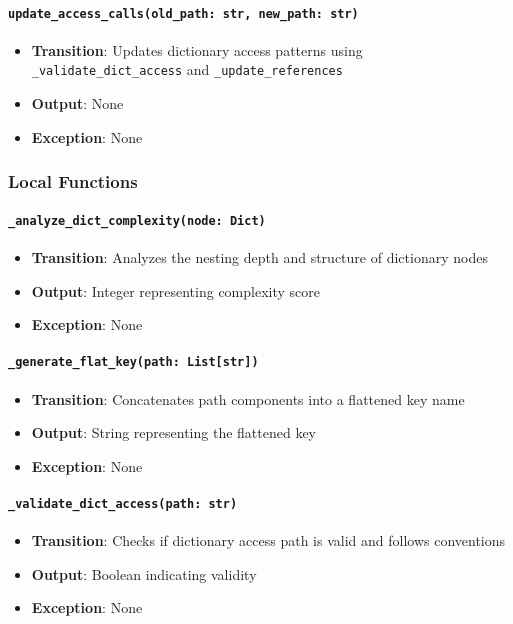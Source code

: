 \documentclass[12pt, titlepage]{article}
\begin{document}
\paragraph{\texttt{update\_access\_calls(old\_path: str, new\_path: str)}}
\begin{itemize}
  \item \textbf{Transition}: Updates dictionary access patterns using \texttt{\_validate\_dict\_access} and \texttt{\_update\_references}
  \item \textbf{Output}: None
  \item \textbf{Exception}: None
\end{itemize}

\subsubsection{Local Functions}

\paragraph{\texttt{\_analyze\_dict\_complexity(node: Dict)}}
\begin{itemize}
  \item \textbf{Transition}: Analyzes the nesting depth and structure of dictionary nodes
  \item \textbf{Output}: Integer representing complexity score
  \item \textbf{Exception}: None
\end{itemize}

\paragraph{\texttt{\_generate\_flat\_key(path: List[str])}}
\begin{itemize}
  \item \textbf{Transition}: Concatenates path components into a flattened key name
  \item \textbf{Output}: String representing the flattened key
  \item \textbf{Exception}: None
\end{itemize}

\paragraph{\texttt{\_validate\_dict\_access(path: str)}}
\begin{itemize}
  \item \textbf{Transition}: Checks if dictionary access path is valid and follows conventions
  \item \textbf{Output}: Boolean indicating validity
  \item \textbf{Exception}: None
\end{itemize}
\end{document}
